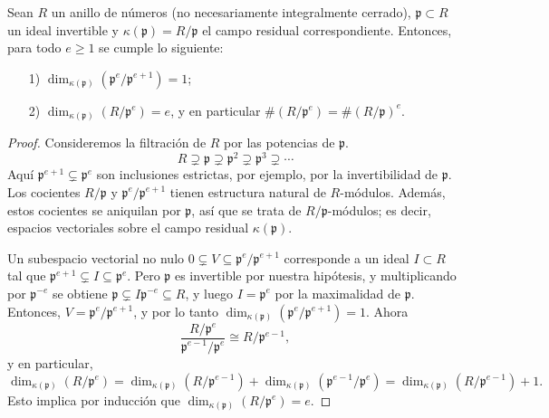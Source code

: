 \begin{lema}
  \label{lema:R/(p-e)}
  Sean $R$ un anillo de números (no necesariamente integralmente cerrado),
  $\mathfrak{p} \subset R$ un ideal invertible y
  $\kappa (\mathfrak{p}) = R/\mathfrak{p}$ el campo residual correspondiente.
  Entonces, para todo $e \ge 1$ se cumple lo siguiente:
  \begin{enumerate}
  \item[1)] $\dim_{\kappa (\mathfrak{p})} (\mathfrak{p}^e/\mathfrak{p}^{e+1}) = 1$;

  \item[2)] $\dim_{\kappa (\mathfrak{p})} (R/\mathfrak{p}^e) = e$, y en particular
    $\# (R/\mathfrak{p}^e) = \# (R/\mathfrak{p})^e$.
  \end{enumerate}

  \begin{proof}
    Consideremos la filtración de $R$ por las potencias de $\mathfrak{p}$.
    \[ R \supsetneq \mathfrak{p} \supsetneq \mathfrak{p}^2 \supsetneq
       \mathfrak{p}^3 \supsetneq \cdots \]
    Aquí $\mathfrak{p}^{e+1} \subsetneq \mathfrak{p}^e$ son inclusiones
    estrictas, por ejemplo, por la invertibilidad de $\mathfrak{p}$.  Los
    cocientes $R/\mathfrak{p}$ y $\mathfrak{p}^e/\mathfrak{p}^{e+1}$ tienen
    estructura natural de $R$-módulos. Además, estos cocientes se aniquilan por
    $\mathfrak{p}$, así que se trata de $R/\mathfrak{p}$-módulos; es decir,
    espacios vectoriales sobre el campo residual $\kappa (\mathfrak{p})$.

    Un subespacio vectorial no nulo
    $0 \subsetneq V \subseteq \mathfrak{p}^e/\mathfrak{p}^{e+1}$
    corresponde a un ideal $I \subset R$ tal que
    $\mathfrak{p}^{e+1} \subsetneq I \subseteq \mathfrak{p}^e$. Pero
    $\mathfrak{p}$ es invertible por nuestra hipótesis, y multiplicando por
    $\mathfrak{p}^{-e}$ se obtiene
    $\mathfrak{p} \subsetneq I \mathfrak{p}^{-e} \subseteq R$, y luego
    $I = \mathfrak{p}^e$ por la maximalidad de $\mathfrak{p}$. Entonces,
    $V = \mathfrak{p}^e/\mathfrak{p}^{e+1}$, y por lo tanto
    $\dim_{\kappa (\mathfrak{p})} (\mathfrak{p}^e/\mathfrak{p}^{e+1}) = 1$.
    Ahora
    \[ \frac{R/\mathfrak{p}^e}{\mathfrak{p}^{e-1}/\mathfrak{p}^e} \cong
    R/\mathfrak{p}^{e-1}, \]
    y en particular,
    \[ \dim_{\kappa (\mathfrak{p})} (R/\mathfrak{p}^e) =
       \dim_{\kappa (\mathfrak{p})} (R/\mathfrak{p}^{e-1}) +
       \dim_{\kappa (\mathfrak{p})} (\mathfrak{p}^{e-1}/\mathfrak{p}^e) =
       \dim_{\kappa (\mathfrak{p})} (R/\mathfrak{p}^{e-1}) + 1. \]
    Esto implica por inducción que
    $\dim_{\kappa (\mathfrak{p})} (R/\mathfrak{p}^e) = e$.
  \end{proof}
\end{lema}

